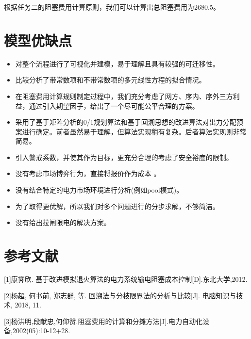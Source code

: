 \documentclass[12pt,a4paper]{ctexart}
\begin{document}
\vspace{1em}

	根据任务二的阻塞费用计算原则，我们可以计算出总阻塞费用为2680.5。




\section{模型优缺点}

{
\vspace{0.5em}
\begin{itemize}
	\item 对整个流程进行了可视化并建模，易于理解且具有较强的可迁移性。
	\item 比较分析了带常数项和不带常数项的多元线性方程的拟合情况。
	\item 在阻塞费用计算规则制定过程中，我们充分考虑了网方、序内、序外三方利益，通过引入期望因子，给出了一个尽可能公平合理的方案。
	\item 采用了基于矩阵分析的0/1规划算法和基于回溯思想的改进算法对出力分配预案进行确定。前者虽然易于理解，但算法实现稍有复杂。后者算法实现则非常简易。
	\item 引入警戒系数，并使其作为目标，更充分合理的考虑了安全裕度的限制。
\end{itemize}
\vspace{0.5em}
{
	\vspace{0.5em}
	\begin{itemize}
		\item 没有考虑市场博弈行为，直接将报价作为成本 。
		\item 没有结合特定的电力市场环境进行分析(例如pool模式)。
		\item 为了取得更优解，所以我们对多个问题进行的分步求解，不够简洁。
		\item 没有给出拉闸限电的解决方案。
	\end{itemize}
\vspace{0.5em}


\section{参考文献}
[1]康霁欣. 基于改进模拟退火算法的电力系统输电阻塞成本控制[D].东北大学,2012.

[2]杨超, 何书前, 郑志群, 等. 回溯法与分枝限界法的分析与比较[J]. 电脑知识与技术, 2018, 11.

[3]杨洪明,段献忠,何仰赞.阻塞费用的计算和分摊方法[J].电力自动化设备,2002(05):10-12+28.

}}
\end{document}
